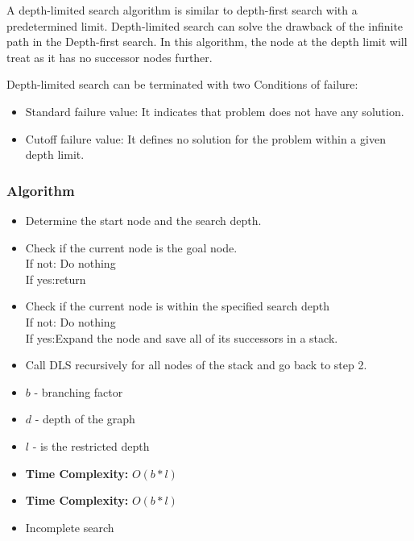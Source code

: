 A depth-limited search algorithm is similar to depth-first search with a
predetermined limit. Depth-limited search can solve the drawback of the
infinite path in the Depth-first search. In this algorithm, the node at
the depth limit will treat as it has no successor nodes further.

Depth-limited search can be terminated with two Conditions of failure:

\begin{itemize}
      \item Standard failure value: It indicates that problem does not have any solution.
      \item Cutoff failure value: It defines no solution for the problem within a
            given depth limit.
\end{itemize}

\subsubsection*{Algorithm}

\begin{itemize}
      \item Determine the start node and the search depth.
      \item Check if the current node is the goal node. \\
            If not: Do nothing \\
            If yes:return
      \item Check if the current node is within the specified search depth \\
            If not: Do nothing \\
            If yes:Expand the node and save all of its successors in a stack.
      \item  Call DLS recursively for all nodes of the stack and go back to step 2.
\end{itemize}

\begin{itemize}
      \item $b$ - branching factor
      \item $d$ - depth of the graph
      \item $l$ - is the restricted depth
      \item \textbf{Time Complexity:} $O(b*l)$
      \item \textbf{Time Complexity:} $O(b*l)$
      \item Incomplete search
\end{itemize}
